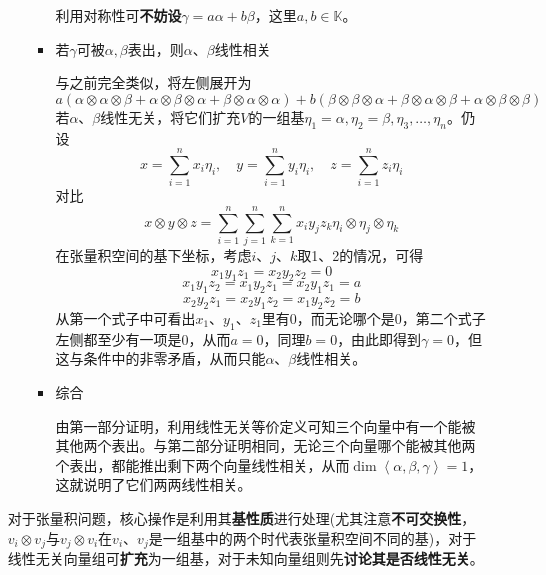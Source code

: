 \documentclass[a4paper,UTF8,fontset=windows,AutoFakeBold]{ctexart}
\newcommand*{\note}{\noindent *}
\begin{document}
\begin{enumerate}
\begin{enumerate}
\begin{itemize}
            利用对称性可\textbf{不妨设}$\gamma=a\alpha+b\beta$，这里$a,b\in\mathbb{K}$。

            \item 若$\gamma$可被$\alpha,\beta$表出，则$\alpha$、$\beta$线性相关
            
            与之前完全类似，将左侧展开为
            $$a(\alpha\otimes\alpha\otimes\beta+\alpha\otimes\beta\otimes\alpha+\beta\otimes\alpha\otimes\alpha)+b(\beta\otimes\beta\otimes\alpha+\beta\otimes\alpha\otimes\beta+\alpha\otimes\beta\otimes\beta)$$
            若$\alpha$、$\beta$线性无关，将它们扩充$V$的一组基$\eta_1=\alpha,\eta_2=\beta,\eta_3,\dots,\eta_n$。仍设
            $$x=\sum_{i=1}^nx_i\eta_i,\quad y=\sum_{i=1}^ny_i\eta_i,\quad z=\sum_{i=1}^nz_i\eta_i$$
            对比
            $$x\otimes y\otimes z=\sum_{i=1}^n\sum_{j=1}^n\sum_{k=1}^nx_iy_jz_k\eta_i\otimes\eta_j\otimes\eta_k$$
            在张量积空间的基下坐标，考虑$i$、$j$、$k$取1、2的情况，可得
            $$x_1y_1z_1=x_2y_2z_2=0$$
            $$x_1y_1z_2=x_1y_2z_1=x_2y_1z_1=a$$
            $$x_2y_2z_1=x_2y_1z_2=x_1y_2z_2=b$$
            从第一个式子中可看出$x_1$、$y_1$、$z_1$里有0，而无论哪个是0，第二个式子左侧都至少有一项是0，从而$a=0$，同理$b=0$，由此即得到$\gamma=0$，但这与条件中的非零矛盾，从而只能$\alpha$、$\beta$线性相关。
            
            \item 综合
            
            由第一部分证明，利用线性无关等价定义可知三个向量中有一个能被其他两个表出。与第二部分证明相同，无论三个向量哪个能被其他两个表出，都能推出剩下两个向量线性相关，从而$\dim\left<\alpha,\beta,\gamma\right>=1$，这就说明了它们两两线性相关。
        \end{itemize}
    \end{enumerate}

    \note 对于张量积问题，核心操作是利用其\textbf{基性质}进行处理(尤其注意\textbf{不可交换性}，$v_i\otimes v_j$与$v_j\otimes v_i$在$v_i$、$v_j$是一组基中的两个时代表张量积空间不同的基)，对于线性无关向量组可\textbf{扩充}为一组基，对于未知向量组则先\textbf{讨论其是否线性无关}。
\end{enumerate}
\end{document}
